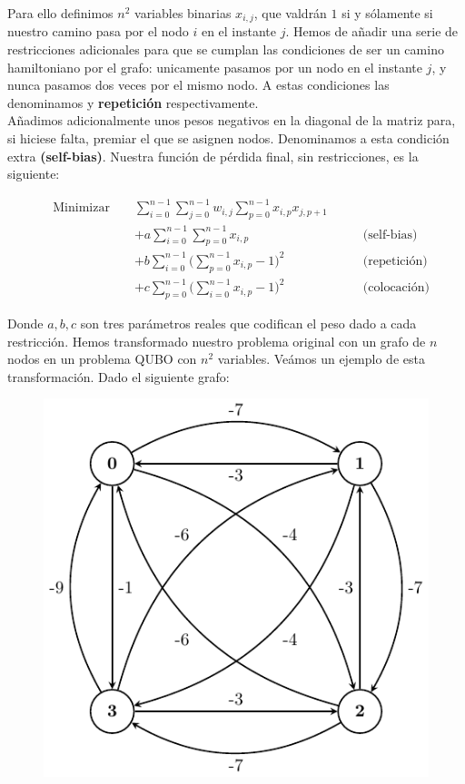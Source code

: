 \documentclass[11pt]{article}
\begin{document}
Para ello definimos $n^2$ variables binarias $x_{i,j}$, que valdrán $1$ si y sólamente si nuestro camino pasa por el nodo $i$ en el instante $j$. Hemos de añadir una serie de restricciones adicionales para que se cumplan las condiciones de ser un camino hamiltoniano por el grafo: unicamente pasamos por un nodo en el instante $j$, y nunca pasamos dos veces por el mismo nodo. A estas condiciones las denominamos  y \textbf{repetición} respectivamente. \\

Añadimos adicionalmente unos pesos negativos en la diagonal de la matriz para, si hiciese falta, premiar el que se asignen nodos. Denominamos a esta condición extra \textbf{(self-bias)}. Nuestra función de pérdida final, sin restricciones, es la siguiente:

\begin{equation}
	\begin{alignedat}{3}
		& \text{Minimizar }	&& \sum_{i=0}^{n-1} \sum_{j=0}^{n-1} w_{i,j}\sum_{p=0}^{n-1} x_{i,p}x_{j,p+1} & \\
		& && + a \sum_{i=0}^{n-1} \sum_{p=0}^{n-1} x_{i,p} & \qquad \text{(self-bias)} \\
		& && + b \sum_{i=0}^{n-1} \Big( \sum_{p=0}^{n-1} x_{i,p} - 1 \Big)^2 & \qquad \text{(repetición)} \\
		& && + c \sum_{p=0}^{n-1} \Big( \sum_{i=0}^{n-1} x_{i,p} - 1 \Big)^2 & \qquad \text{(colocación)}
	\end{alignedat}
\end{equation}

Donde $a,b,c$ son tres parámetros reales que codifican el peso dado a cada restricción. Hemos transformado nuestro problema original con un grafo de $n$ nodos en un problema QUBO con $n^2$ variables. Veámos un ejemplo de esta transformación. Dado el siguiente grafo:

\begin{figure}[H]
	\includegraphics[scale=1.1]{figures/salesman-example.pdf}
	\centering
	\label{fig:salesman-example}
\end{figure}
\end{document}
